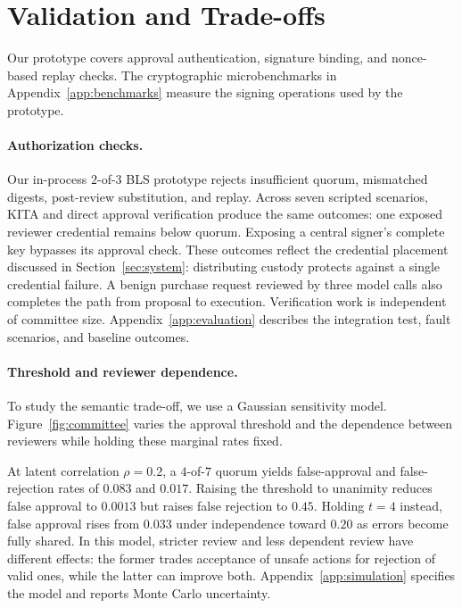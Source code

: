 \documentclass{article}
\begin{document}
\section{Validation and Trade-offs}
\label{sec:eval}
Our prototype covers approval authentication, signature binding, and
nonce-based replay checks. 
The cryptographic microbenchmarks in Appendix~\ref{app:benchmarks} measure
the signing operations used by the prototype.

\paragraph{Authorization checks.}
Our in-process $2$-of-$3$ BLS prototype rejects insufficient quorum,
mismatched digests, post-review substitution, and replay. Across seven
scripted scenarios, \textsf{KITA} and direct approval verification produce the same
outcomes: one exposed reviewer credential remains below quorum. Exposing a central signer's complete key bypasses its approval check. These outcomes reflect the credential placement discussed in Section~\ref{sec:system}: distributing custody
protects against a single credential failure.
A benign purchase request reviewed by three model calls also completes the
path from proposal to execution.  Verification work is independent of committee size. Appendix~\ref{app:evaluation}
describes the integration test, fault scenarios, and baseline outcomes.

\paragraph{Threshold and reviewer dependence.}
To study the semantic trade-off, we use a Gaussian sensitivity model. Figure~\ref{fig:committee} varies the
approval threshold and the dependence between reviewers while holding these
marginal rates fixed.

At latent correlation $\rho=0.2$, a $4$-of-$7$ quorum yields false-approval
and false-rejection rates of $0.083$ and $0.017$. Raising the threshold to
unanimity reduces false approval to $0.0013$ but raises false rejection to
$0.45$. Holding $t=4$ instead, false approval rises from $0.033$ under
independence toward $0.20$ as errors become fully shared. In this model,
stricter review and less dependent review have different effects: the former
trades acceptance of unsafe actions for rejection of valid ones, while the
latter can improve both. Appendix~\ref{app:simulation} specifies the model
and reports Monte Carlo uncertainty.
\end{document}
